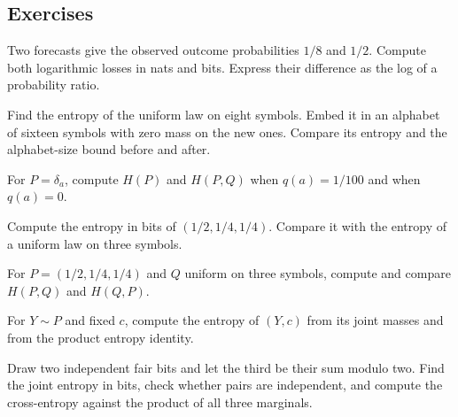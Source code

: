 \documentclass[11pt,oneside]{book}
\theoremstyle{definition}
\theoremstyle{remark}
\begin{document}
\subsection{Exercises}
\label{subsec:worked-examples-3-1}

\begin{practiceexercise}
\label{wex:rare-outcome-bits}
Two forecasts give the observed outcome probabilities $1/8$ and $1/2$.
Compute both logarithmic losses in nats and bits. Express their difference
as the log of a probability ratio.
\end{practiceexercise}

\begin{practiceexercise}
\label{wex:uniform-entropy-unused-alphabet}
Find the entropy of the uniform law on eight symbols. Embed it in an
alphabet of sixteen symbols with zero mass on the new ones. Compare its
entropy and the alphabet-size bound before and after.
\end{practiceexercise}

\begin{practiceexercise}
\label{wex:deterministic-truth-forecast}
For $P=\delta_a$, compute $H(P)$ and $H(P,Q)$ when $q(a)=1/100$ and when
$q(a)=0$.
\end{practiceexercise}

\begin{practiceexercise}
\label{wex:entropy-in-bits}
Compute the entropy in bits of $(1/2,1/4,1/4)$. Compare it with the entropy
of a uniform law on three symbols.
\end{practiceexercise}

\begin{practiceexercise}
\label{wex:finite-cross-entropy-asymmetry}
For $P=(1/2,1/4,1/4)$ and $Q$ uniform on three symbols, compute and compare
$H(P,Q)$ and $H(Q,P)$.
\end{practiceexercise}

\begin{practiceexercise}
\label{wex:deterministic-coordinate-entropy}
For $Y\sim P$ and fixed $c$, compute the entropy of $(Y,c)$ from its joint
masses and from the product entropy identity.
\end{practiceexercise}

\begin{practiceexercise}
\label{wex:parity-entropy}
Draw two independent fair bits and let the third be their sum modulo two.
Find the joint entropy in bits, check whether pairs are independent, and
compute the cross-entropy against the product of all three marginals.
\end{practiceexercise}
\end{document}

